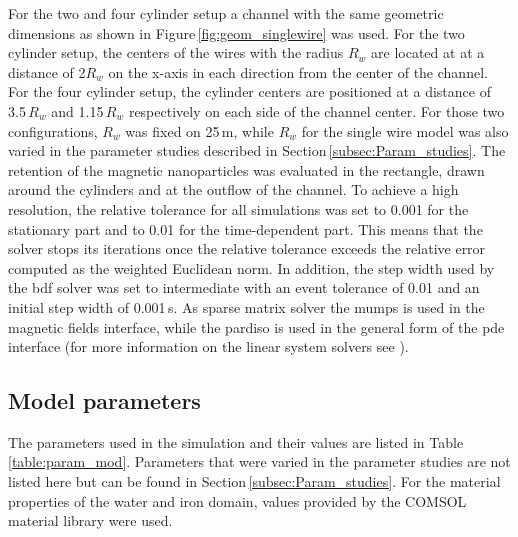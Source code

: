 For the two and four cylinder setup a channel with the same geometric dimensions as shown in Figure\,\ref{fig:geom_singlewire} was used. For the two cylinder setup, the centers of the wires with the radius $R_{w}$ are located at at a distance of 2$R_{w}$ on the x-axis in each direction from the center of the channel. For the four cylinder setup, the cylinder centers are positioned at a distance of 3.5\,$R_{w}$ and 1.15\,$R_{w}$ respectively on each side of the channel center. For those two configurations, $R_{w}$ was fixed on 25\,\textmu m, while $R_{w}$ for the single wire model was also varied in the parameter studies described in Section\,\ref{subsec:Param_studies}. The retention of the magnetic nanoparticles was evaluated in the rectangle, drawn around the cylinders and at the outflow of the channel. To achieve a high resolution, the relative tolerance for all simulations was set to 0.001 for the stationary part and to 0.01 for the time-dependent part. This means that the solver stops its iterations once the relative tolerance exceeds the relative error computed as the weighted Euclidean norm. In addition, the step width used by the \gls{bdf} solver was set to intermediate with an event tolerance of 0.01 and an initial step width of 0.001\,s. As sparse matrix solver the \gls{mumps} is used in the magnetic fields interface, while the \gls{pardiso} is used in the general form of the \gls{pde} interface (for more information on the linear system solvers see \cite{ComsolRefManual}).   

\newpage
\subsection{Model parameters}
\label{subsec:Cond_param}

The parameters used in the simulation and their values are listed in Table\,\ref{table:param_mod}. Parameters that were varied in the parameter studies are not listed here but can be found in Section\,\ref{subsec:Param_studies}. For the material properties of the water and iron domain, values provided by the COMSOL material library were used.   

